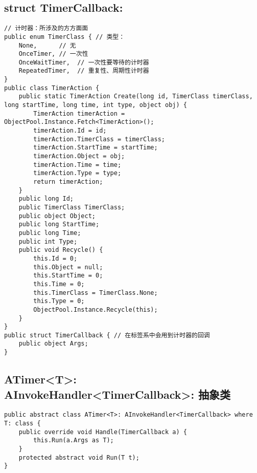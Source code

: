 \documentclass[9pt, b5paper]{article}
\begin{document}
\subsection{struct TimerCallback:}
\label{sec-1-19}
\begin{verbatim}
// 计时器：所涉及的方方面面
public enum TimerClass { // 类型：
    None,      // 无
    OnceTimer, // 一次性
    OnceWaitTimer,  // 一次性要等待的计时器
    RepeatedTimer,  // 重复性、周期性计时器
}
public class TimerAction {
    public static TimerAction Create(long id, TimerClass timerClass, long startTime, long time, int type, object obj) {
        TimerAction timerAction = ObjectPool.Instance.Fetch<TimerAction>();
        timerAction.Id = id;
        timerAction.TimerClass = timerClass;
        timerAction.StartTime = startTime;
        timerAction.Object = obj;
        timerAction.Time = time;
        timerAction.Type = type;
        return timerAction;
    }
    public long Id;
    public TimerClass TimerClass;
    public object Object;
    public long StartTime;
    public long Time;
    public int Type;
    public void Recycle() {
        this.Id = 0;
        this.Object = null;
        this.StartTime = 0;
        this.Time = 0;
        this.TimerClass = TimerClass.None;
        this.Type = 0;
        ObjectPool.Instance.Recycle(this);
    }
}
public struct TimerCallback { // 在标签系中会用到计时器的回调
    public object Args;
}
\end{verbatim}
\subsection{ATimer<T>: AInvokeHandler<TimerCallback>: 抽象类}
\label{sec-1-20}
\begin{verbatim}
public abstract class ATimer<T>: AInvokeHandler<TimerCallback> where T: class {
    public override void Handle(TimerCallback a) {
        this.Run(a.Args as T);
    }
    protected abstract void Run(T t);
}
\end{verbatim}
\end{document}
